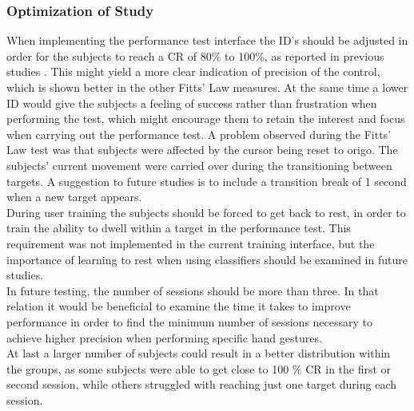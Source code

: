 \subsubsection{Optimization of Study}
When implementing the performance test interface the ID's should be adjusted in order for the subjects to reach a CR of 80\% to 100\%, as reported in previous studies \cite{Scheme2013, Scheme2013a}. This might yield a more clear indication of precision of the control, which is shown better in the other Fitts' Law measures. At the same time a lower ID would give the subjects a feeling of success rather than frustration when performing the test, which might encourage them to retain the interest and focus when carrying out the performance test.
A problem observed during the Fitts' Law test was that subjects were affected by the cursor being reset to origo. The subjects' current movement were carried over during the transitioning between targets. A suggestion to future studies is to include a transition break of 1 second when a new target appears. \\
During user training the subjects should be forced to get back to rest, in order to train the ability to dwell within a target in the performance test. This requirement was not implemented in the current training interface, but the importance of learning to rest when using classifiers should be examined in future studies.\\
In future testing, the number of sessions should be more than three. In that relation it would be beneficial to examine the time it takes to improve performance in order to find the minimum number of sessions necessary to achieve higher precision when performing specific hand gestures. \\
At last a larger number of subjects could result in a better distribution within the groups, as some subjects were able to get close to 100 \% CR in the first or second session, while others struggled with reaching just one target during each session. 
